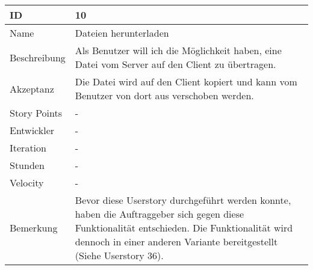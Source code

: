 \begin{table}[htbp]
    \begin{minipage}{\linewidth}
        \setlength{\tymax}{0.5\linewidth}
        \centering
        \small
        \begin{tabulary}{\textwidth}{|l|p{10cm}|} \hline
            ID   &10\\\hline
            Name  &Dateien herunterladen\\\hline
	    Beschreibung&Als Benutzer will ich die Möglichkeit haben, eine Datei vom Server auf den Client zu übertragen.\\\hline
            Akzeptanz &Die Datei wird auf den Client kopiert und kann vom Benutzer von dort aus verschoben werden.\\\hline
            Story Points&-\\\hline
            Entwickler &-\\\hline
            Iteration &-\\\hline
            Stunden  &-\\\hline
            Velocity &-\\\hline
            Bemerkung & Bevor diese Userstory durchgeführt werden konnte, haben die Auftraggeber sich gegen diese Funktionalität entschieden. Die Funktionalität wird dennoch in einer anderen Variante bereitgestellt (Siehe Userstory 36). \\\hline
        \end{tabulary}
    \end{minipage}
\end{table}



